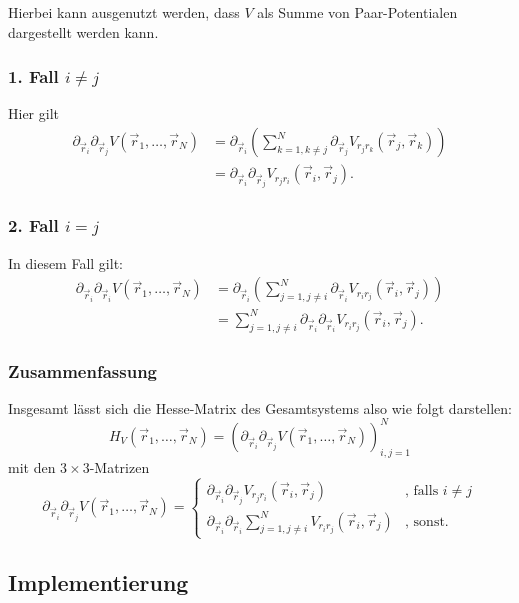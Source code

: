 \documentclass{scrartcl}
\begin{document}
Hierbei kann ausgenutzt werden, dass \(V\) als Summe von
Paar-Potentialen dargestellt werden kann.

\subsubsection*{1. Fall \(i \neq j\)}
\label{sec:1.-fall}
Hier gilt
\begin{align*}
\partial_{\vec{r}_i}\partial_{\vec{r}_j} V(\vec{r}_1, \dots, \vec{r}_N) &= \partial_{\vec{r}_i} \left( \sum_{k=1, k\neq j}^N \partial_{\vec{r}_j} V_{r_j r_k}(\vec{r}_j, \vec{r}_k) \right) \\
&= \partial_{\vec{r}_i}\partial_{\vec{r}_j} V_{r_j r_i}(\vec{r}_i, \vec{r}_j).
\end{align*}

\subsubsection*{2. Fall \(i = j\)}
\label{sec:2.-fall}
In diesem Fall gilt:
\begin{align*}
\partial_{\vec{r}_i}\partial_{\vec{r}_i} V(\vec{r}_1, \dots, \vec{r}_N) &= \partial_{\vec{r}_i} \left( \sum_{j=1, j\neq i}^N \partial_{\vec{r}_i} V_{r_i r_j}(\vec{r}_i, \vec{r}_j) \right) \\
&= \sum_{j=1, j\neq i}^N \partial_{\vec{r}_i} \partial_{\vec{r}_i} V_{r_i r_j}(\vec{r}_i, \vec{r}_j).
\end{align*}

\subsubsection*{Zusammenfassung}
\label{sec:zusammenfassung}

Insgesamt lässt sich die Hesse-Matrix des Gesamtsystems also wie folgt
darstellen:
\[H_V(\vec{r}_1, \dots, \vec{r}_N) =
\left( \partial_{\vec{r}_i} \partial_{\vec{r}_j} V(\vec{r}_1, \dots,
  \vec{r}_N) \right)_{i,j = 1}^N \]
mit den \(3\times 3\)-Matrizen
\[
\partial_{\vec{r}_i}\partial_{\vec{r}_j} V(\vec{r}_1, \dots, \vec{r}_N) =
\begin{cases}
  \partial_{\vec{r}_i}\partial_{\vec{r}_j} V_{r_j r_i}(\vec{r}_i,
  \vec{r}_j) & \text{, falls } i \neq j \\
  \partial_{\vec{r}_i} \partial_{\vec{r}_i} \sum_{j=1, j\neq i}^N
  V_{r_i r_j}(\vec{r}_i, \vec{r}_j) & \text{, sonst.}
\end{cases}
\]

\subsection*{Implementierung}
\label{sec:implementierung}
\end{document}
